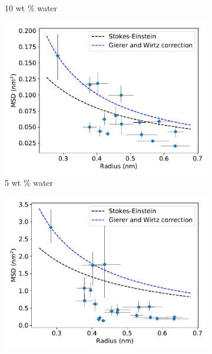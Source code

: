 \documentclass{article}
\begin{document}
\begin{figure}
\begin{subfigure}{0.45\textwidth}
  \caption{10 wt \% water}\label{fig:all_msds_10wt}
  \end{subfigure}
  \begin{subfigure}{0.45\textwidth}
  \includegraphics[width=\textwidth]{msd_radius_5wt.pdf} 
  \caption{5 wt \% water}\label{fig:msd_radius_5wt}
  \end{subfigure}
  \begin{subfigure}{0.45\textwidth}
  \includegraphics[width=\textwidth]{msd_radius_10wt.pdf} 

\end{subfigure}
\end{figure}
\end{document}
